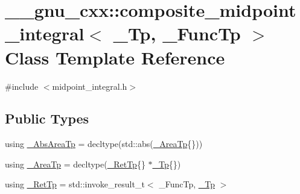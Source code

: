 \hypertarget{class____gnu__cxx_1_1composite__midpoint__integral}{}\section{\+\_\+\+\_\+gnu\+\_\+cxx\+:\+:composite\+\_\+midpoint\+\_\+integral$<$ \+\_\+\+Tp, \+\_\+\+Func\+Tp $>$ Class Template Reference}
\label{class____gnu__cxx_1_1composite__midpoint__integral}


{\ttfamily \#include $<$midpoint\+\_\+integral.\+h$>$}

\subsection*{Public Types}
\begin{DoxyCompactItemize}
\item 
using \hyperlink{class____gnu__cxx_1_1composite__midpoint__integral_a7b1fb3ea8fc30b6099cea19948fda4a9}{\+\_\+\+Abs\+Area\+Tp} = decltype(std\+::abs(\hyperlink{class____gnu__cxx_1_1composite__midpoint__integral_a02175286c06db2fab6f727eab5117b25}{\+\_\+\+Area\+Tp}\{\}))
\item 
using \hyperlink{class____gnu__cxx_1_1composite__midpoint__integral_a02175286c06db2fab6f727eab5117b25}{\+\_\+\+Area\+Tp} = decltype(\hyperlink{class____gnu__cxx_1_1composite__midpoint__integral_a092b0a129f0d5cd5f7a82d58f8117f94}{\+\_\+\+Ret\+Tp}\{\} $\ast$\hyperlink{namespace____gnu__cxx_a3b19a9c800ca194374ef9172290f7d79}{\+\_\+\+Tp}\{\})
\item 
using \hyperlink{class____gnu__cxx_1_1composite__midpoint__integral_a092b0a129f0d5cd5f7a82d58f8117f94}{\+\_\+\+Ret\+Tp} = std\+::invoke\+\_\+result\+\_\+t$<$ \+\_\+\+Func\+Tp, \hyperlink{namespace____gnu__cxx_a3b19a9c800ca194374ef9172290f7d79}{\+\_\+\+Tp} $>$
\end{DoxyCompactItemize}
